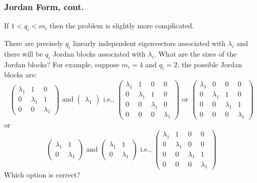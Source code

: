 \documentclass{beamer}
\begin{document}
\begin{frame}\frametitle{Jordan Form, cont.}
	If $1 < q_i < m_i$ then the problem is slightly more complicated. 
	
	\vfill
	
	There are precisely $q_i$ linearly independent eigenvectors associated
	with $\lambda_i$ and there will be $q_i$ Jordan blocks associated with
	$\lambda_i$.  What are the sizes of the Jordan blocks?  For example,
	suppose $m_i = 4$ and $q_i = 2$, the possible Jordan blocks are:
	{\footnotesize
		\[ 
			\begin{pmatrix}
		    	\lambda_1 & 1 & 0\\
		    	0 & \lambda_1 & 1\\
		    	0 & 0 & \lambda_1
		  	\end{pmatrix} 
		  	\text{ and }
			\begin{pmatrix}
		    	\lambda_1
		  	\end{pmatrix}
		  	\text{ i.e., } 
			\begin{pmatrix}
		    	\lambda_1 & 1 & 0 & 0\\
		    	0 & \lambda_1 & 1 & 0\\
		    	0 & 0 & \lambda_1 & 0\\
		    	0 & 0 & 0 & \lambda_1
		  	\end{pmatrix}
		  	\text{ or }
		  	\begin{pmatrix}
		    	\lambda_1 & 0 & 0 & 0\\
		    	0 & \lambda_1 & 1 & 0\\
		    	0 & 0 & \lambda_1 & 1\\
		    	0 & 0 & 0 & \lambda_1
		  	\end{pmatrix}
		\]
	}
	or
	\[ 
		\begin{pmatrix}
	    	\lambda_1 & 1\\
	    	0 & \lambda_1
	  	\end{pmatrix} 
	  	\text{ and }
		\begin{pmatrix}
	    	\lambda_1 & 1\\
	    	0 & \lambda_1
	  	\end{pmatrix}
	  	\text{ i.e., }
	  	\begin{pmatrix}
	    	\lambda_1 & 1 & 0 & 0\\
	    	0 & \lambda_1 & 0 & 0\\
	    	0 & 0 & \lambda_1 & 1\\
	    	0 & 0 & 0 & \lambda_1	  		
	  	\end{pmatrix}
	\]	
	Which option is correct?	
\end{frame}
\end{document}
